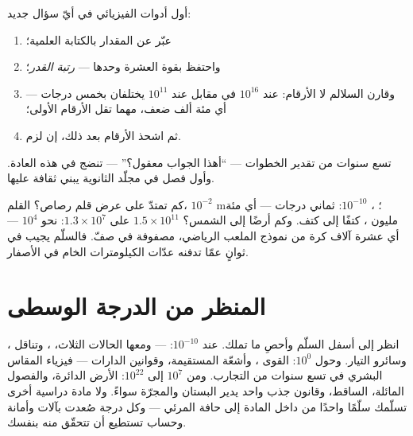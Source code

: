 \begin{method}\label{met:g9:atoms-to-galaxies:oom}
أول أدوات الفيزيائي في أيّ سؤال جديد:
\begin{enumerate}
  \item عبّر عن المقدار بالكتابة العلمية؛
  \item واحتفظ بقوة العشرة وحدها --- \emph{رتبة
        القدر}؛
  \item وقارن السلالم لا الأرقام:  عند $10^{16}$  في
        مقابل  عند $10^{11}$ يختلفان بخمس درجات --- أي
        مئة ألف ضعف، مهما تقل الأرقام الأولى؛
  \item ثم اشحذ الأرقام بعد ذلك، إن لزم.
\end{enumerate}
تسع سنوات من تقدير الخطوات --- ``أهذا الجواب معقول؟'' ---
تنضج في هذه العادة. وأول فصل في مجلّد الثانوية يبني ثقافة
 عليها.
\end{method}

\begin{example}\label{ex:g9:atoms-to-galaxies:arithmetic}
كم  تمتدّ على عرض قلم رصاص؟ القلم، $10^{-2}$ \unit{m}؛
، $10^{-10}$: ثماني درجات --- أي مئة مليون ، كتفًا
إلى كتف. وكم أرضًا إلى الشمس؟ $1.5 \times 10^{11}$ على
$1.3 \times 10^{7}$: نحو $10^{4}$ --- أي عشرة آلاف كرة من
نموذج الملعب الرياضي، مصفوفة في صفّ. فالسلّم يجيب في ثوانٍ
عمّا تدفنه عدّات الكيلومترات الخام في الأصفار.
\end{example}

\section{المنظر من الدرجة الوسطى}

\begin{remark}\label{rem:g9:atoms-to-galaxies:built}
انظر إلى أسفل السلّم وأحصِ ما تملك. عند $10^{-10}$: 
 --- ومعها الحالات الثلاث، ، وتناقل ،
وسائرو التيار. وحول $10^{0}$: القوى ، وأشعّة 
المستقيمة، وقوانين الدارات --- فيزياء المقاس البشري في تسع
سنوات من التجارب. ومن $10^{7}$ إلى $10^{22}$: الأرض الدائرة،
والفصول المائلة،  الساقط، وقانون جذب واحد يدير البستان
والمجرّة سواءً. ولا مادة دراسية أخرى تسلّمك سلّمًا واحدًا من
داخل المادة إلى حافة المرئي --- وكل درجة صُعدت بآلات وأمانة
وحساب تستطيع أن تتحقّق منه بنفسك.
\end{remark}

